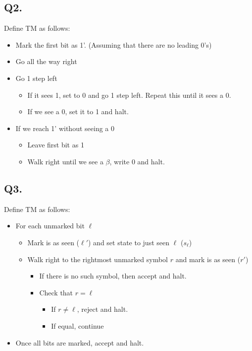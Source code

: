 \documentclass[letterpaper]{article}
\begin{document}
\subsection*{Q2.}

Define TM as follows:
\begin{itemize}
      \item Mark the first bit as 1'. (Assuming that there are no leading 0's)
      \item Go all the way right
      \item Go 1 step left
            \begin{itemize}
                  \item If it sees 1, set to 0 and go 1 step left. Repeat this until it sees a 0.
                  \item If we see a 0, set it to 1 and halt.
            \end{itemize}
      \item If we reach 1' without seeing a 0
            \begin{itemize}
                  \item Leave first bit as 1
                  \item Walk right until we see a $\beta$, write 0 and halt.
            \end{itemize}
\end{itemize}

\subsection*{Q3.}

Define TM as follows:
\begin{itemize}
      \item For each unmarked bit $\ell$
            \begin{itemize}
                  \item Mark is as seen ($\ell'$) and set state to just seen $\ell$ ($s_\ell$)
                  \item Walk right to the rightmost unmarked symbol $r$ and mark is as seen ($r'$)
                        \begin{itemize}
                              \item If there is no such symbol, then accept and halt.
                              \item Check that $r = \ell$
                                    \begin{itemize}
                                          \item If $r \ne \ell$, reject and halt.
                                          \item If equal, continue
                                    \end{itemize}
                        \end{itemize}
            \end{itemize}
      \item Once all bits are marked, accept and halt.
\end{itemize}
\end{document}
